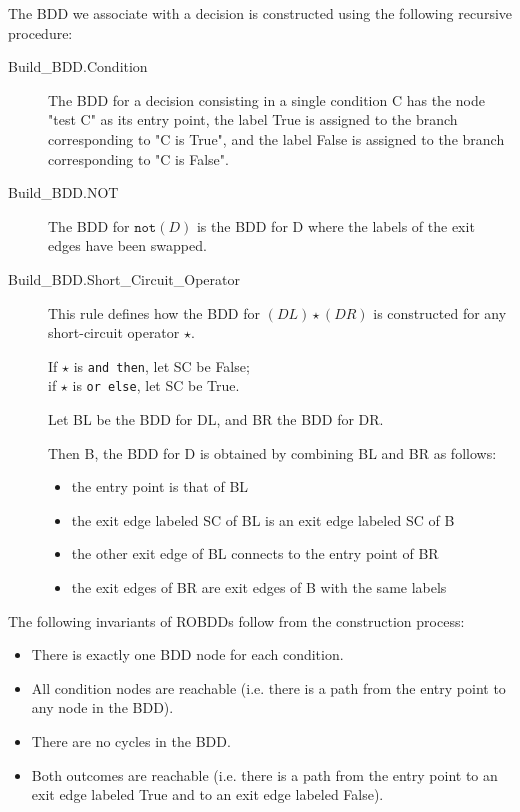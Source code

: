 \documentclass[a4paper,12pt,twoside]{article}
\newcommand{\anysc}{\star}
\newcommand{\andthen}{\texttt{and then}}
\newcommand{\orelse}{\texttt{or else}}
\newcommand{\adanot}{\texttt{not}}
\begin{document}
The BDD we associate with a decision is constructed using the following
recursive procedure:

\begin{description}
\item[Build\_BDD.Condition]
  The BDD for a decision consisting in a single condition C has the node
  "test C" as its entry point, the label True is assigned to the branch
  corresponding to "C is True", and the label False is assigned to the
  branch corresponding to "C is False".

\item[Build\_BDD.NOT]
  The BDD for $\adanot{} (D)$ is the BDD for D where the labels of the exit
  edges have been swapped.

\item[Build\_BDD.Short\_Circuit\_Operator]
  This rule defines how the BDD for $(DL) \anysc{} (DR)$ is constructed for
  any short-circuit operator $\anysc{}$.

  If $\anysc{}$ is \andthen{}, let SC be False;\\
  if $\anysc{}$ is \orelse{}, let SC be True.

  Let BL be the BDD for DL, and BR the BDD for DR.

  Then B, the BDD for D is obtained by combining BL and BR as follows:
  \begin{itemize}
    \item the entry point is that of BL
    \item the exit edge labeled SC of BL is an exit edge labeled SC of B
    \item the other exit edge of BL connects to the entry point of BR
    \item the exit edges of BR are exit edges of B with the same labels
  \end{itemize}
\end{description}

The following invariants of ROBDDs follow from the construction process:
\begin{itemize}
  \item There is exactly one BDD node for each condition.
  \item All condition nodes are reachable (i.e. there is a path from
        the entry point to any node in the BDD).
  \item There are no cycles in the BDD.
  \item Both outcomes are reachable (i.e. there is a path from the entry point
        to an exit edge labeled True and to an exit edge labeled False).
\end{itemize}
\end{document}
